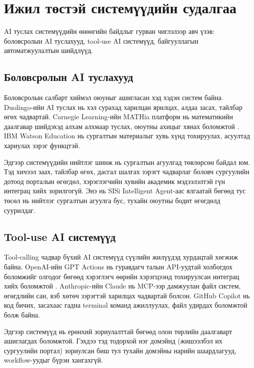\section{Ижил төстэй системүүдийн судалгаа}

AI туслах системүүдийн өнөөгийн байдлыг гурван чиглэлээр авч үзэв: боловсролын AI туслахууд, tool-use AI системүүд, байгууллагын автоматжуулалтын шийдлүүд.

\subsection{Боловсролын AI туслахууд}

Боловсролын салбарт хиймэл оюуныг ашигласан хэд хэдэн систем байна. Duolingo-ийн AI туслах нь хэл сурахад харилцан ярилцах, алдаа засах, тайлбар өгөх чадвартай. Carnegie Learning-ийн MATHia платформ нь математикийн даалгавар шийдэхэд алхам алхмаар туслах, оюутны ахицыг хянах боломжтой \citep{carnegie-learning}. IBM Watson Education нь сургалтын материалыг хувь хүнд тохируулах, асуултад хариулах зэрэг функцтэй.

Эдгээр системүүдийн нийтлэг шинж нь сургалтын агуулгад төвлөрсөн байдал юм. Тэд хичээл заах, тайлбар өгөх, дасгал шалгах зэрэгт чадварлаг боловч сургуулийн дотоод порталын өгөгдөл, хэрэглэгчийн хувийн академик мэдээлэлтэй гүн интеграц хийх зорилгогүй. Энэ нь SISi Intelligent Agent-аас ялгаатай бөгөөд тус төсөл нь нийтлэг сургалтын агуулга бус, тухайн оюутны бодит өгөгдөлд суурилдаг.

\subsection{Tool-use AI системүүд}

Tool-calling чадвар бүхий AI системүүд сүүлийн жилүүдэд хурдацтай хөгжиж байна. OpenAI-ийн GPT Actions нь гуравдагч талын API-уудтай холбогдох боломжийг олгодог бөгөөд хэрэглэгч өөрийн хэрэгцээнд тохируулсан интеграц хийх боломжтой \citep{openai-actions}. Anthropic-ийн Claude нь MCP-ээр дамжуулан файл систем, өгөгдлийн сан, вэб хөтөч зэрэгтэй харилцах чадвартай болсон. GitHub Copilot нь код бичих, засахаас гадна terminal команд ажиллуулах, файл удирдах боломжтой болж байна.

Эдгээр системүүд нь ерөнхий зориулалттай бөгөөд олон төрлийн даалгаварт ашиглагдах боломжтой. Гэхдээ тэд тодорхой нэг домэйнд (жишээлбэл их сургуулийн портал) зориулсан биш тул тухайн домэйны нарийн шаардлагууд, workflow-уудыг бүрэн хангахгүй.

